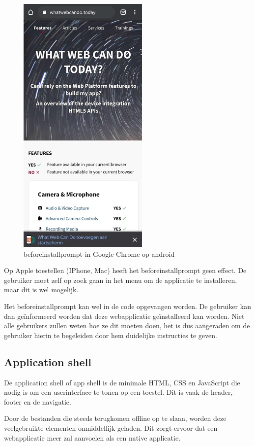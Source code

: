 	\begin{figure}[H]
		\centering
		\includegraphics{./img/beforeinstallprompt_android.png}
		\caption{beforeinstallprompt in Google Chrome op android}
	\end{figure}
	
	Op Apple toestellen (IPhone, Mac) heeft het beforeinstallprompt geen effect. De gebruiker moet zelf op zoek gaan in het menu om de applicatie te installeren, maar dit is wel mogelijk.
	
	Het beforeinstallprompt kan wel in de code opgevangen worden. De  gebruiker kan dan geïnformeerd worden dat deze webapplicatie geïnstalleerd kan worden. 
	Niet alle gebruikers zullen weten hoe ze dit moeten doen, het is dus aangeraden om de gebruiker hierin te begeleiden door hem duidelijke instructies te geven.
	\autocite{PWAbuilder2020}


\subsection{Application shell}
	De application shell of app shell is de minimale HTML, CSS en JavaScript die nodig is om een userinterface te tonen op een toestel. Dit is vaak de header, footer en de navigatie.
	
	Door de bestanden die steeds terugkomen offline op te slaan, worden deze veelgebruikte elementen onmiddellijk geladen. Dit zorgt ervoor dat een webapplicatie meer zal aanvoelen als een native applicatie.
	
